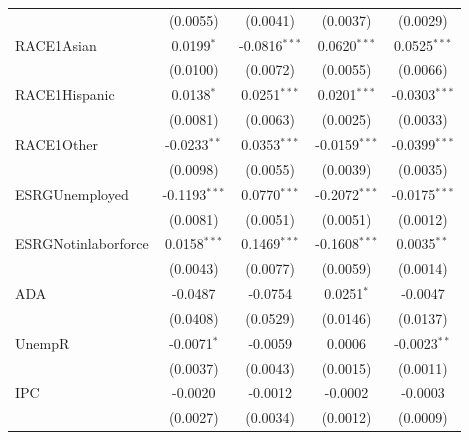 \begin{tabular}{lcccc}
                                             & (0.0055)        & (0.0041)        & (0.0037)        & (0.0029)\\   
   RACE1Asian                                & 0.0199$^{*}$    & -0.0816$^{***}$ & 0.0620$^{***}$  & 0.0525$^{***}$\\   
                                             & (0.0100)        & (0.0072)        & (0.0055)        & (0.0066)\\   
   RACE1Hispanic                             & 0.0138$^{*}$    & 0.0251$^{***}$  & 0.0201$^{***}$  & -0.0303$^{***}$\\   
                                             & (0.0081)        & (0.0063)        & (0.0025)        & (0.0033)\\   
   RACE1Other                                & -0.0233$^{**}$  & 0.0353$^{***}$  & -0.0159$^{***}$ & -0.0399$^{***}$\\   
                                             & (0.0098)        & (0.0055)        & (0.0039)        & (0.0035)\\   
   ESRGUnemployed                            & -0.1193$^{***}$ & 0.0770$^{***}$  & -0.2072$^{***}$ & -0.0175$^{***}$\\   
                                             & (0.0081)        & (0.0051)        & (0.0051)        & (0.0012)\\   
   ESRGNotinlaborforce                       & 0.0158$^{***}$  & 0.1469$^{***}$  & -0.1608$^{***}$ & 0.0035$^{**}$\\   
                                             & (0.0043)        & (0.0077)        & (0.0059)        & (0.0014)\\   
   ADA                                       & -0.0487         & -0.0754         & 0.0251$^{*}$    & -0.0047\\   
                                             & (0.0408)        & (0.0529)        & (0.0146)        & (0.0137)\\   
   UnempR                                    & -0.0071$^{*}$   & -0.0059         & 0.0006          & -0.0023$^{**}$\\   
                                             & (0.0037)        & (0.0043)        & (0.0015)        & (0.0011)\\   
   IPC                                       & -0.0020         & -0.0012         & -0.0002         & -0.0003\\   
                                             & (0.0027)        & (0.0034)        & (0.0012)        & (0.0009)\\   

\end{tabular}
